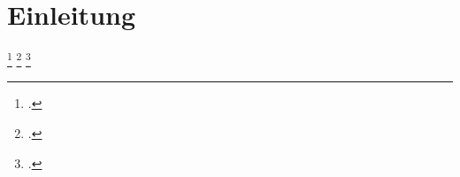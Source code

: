 
\chapter{Einleitung}
\blindtext[1]
\blindtext[1]\footcites{BSG1415HS}{BSG1515HS}{Loewisch1985}
\blindtext[1]
\blindtext[1]\footcites{BSG1415HS}{LSGBB147}{Risse1985}
\blindtext[1]
\blindtext[1]\footcites{BSG1715HS}{LSGBB147}
\blindtext[1]

\chapterbib
